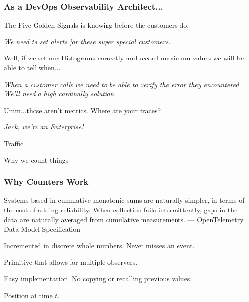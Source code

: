 \begin{frame}
    \frametitle{As a DevOps Observability Architect...}

    The  Five Golden Signals is knowing before the customers do.

    \begin{quotebox}
        \emph{We need to set alerts for these super special customers.}
    \end{quotebox}

    Well, if we set our Histograms correctly and record maximum values we will
    be able to tell when...

    \begin{quotebox}
        \emph{When a customer calls we need to be able to verify the error
            they encountered.  We'll need a high cardinally solution.}
    \end{quotebox}

    Umm...those aren't metrics.  Where are your traces?

    \begin{quotebox}
        \emph{Jack, we're an Enterprise!}
    \end{quotebox}
\end{frame}


\begin{frame}[standout]
    Traffic

    \small{Why we count things}
\end{frame}


\begin{frame}
    \frametitle{Why Counters Work}

    \begin{quotebox}
         Systems based in cumulative monotonic sums are naturally simpler, in
         terms of the cost of adding reliability. When collection fails
         intermittently, gaps in the data are naturally averaged from
         cumulative measurements.
         \tcblower
         \hfill --- OpenTelemetry Data Model Specification
    \end{quotebox}

    \begin{description}[labelwidth=\widthof{Synchronization}]
        \item[Accurate] Incremented in discrete whole numbers.  Never misses an event.
        \item[Synchronization] Primitive that allows for multiple observers.
        \item[Low Overhead] Easy implementation.  No copying or recalling previous values.
        \item[Fundamental] Position at time $t$.
    \end{description}

\end{frame}

